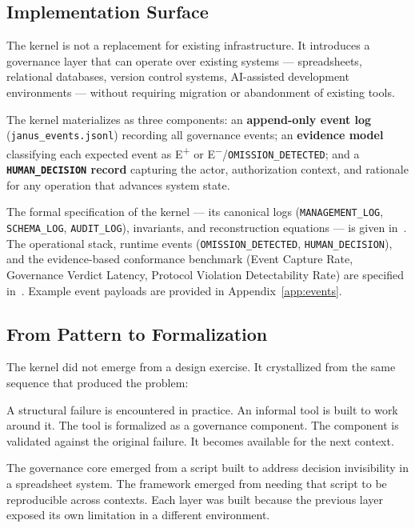 \documentclass[conference]{IEEEtran}
\begin{document}
\subsection{Implementation Surface}

The kernel is not a replacement for existing infrastructure. It introduces a governance layer that can operate over existing systems --- spreadsheets, relational databases, version control systems, AI-assisted development environments --- without requiring migration or abandonment of existing tools.

The kernel materializes as three components: an \textbf{append-only event log} (\texttt{janus\_events.jsonl}) recording all governance events; an \textbf{evidence model} classifying each expected event as E\textsuperscript{+} or E\textsuperscript{$-$}/\texttt{OMISSION\_DETECTED}; and a \textbf{\texttt{HUMAN\_DECISION} record} capturing the actor, authorization context, and rationale for any operation that advances system state.

The formal specification of the kernel --- its canonical logs (\texttt{MANAGEMENT\_LOG}, \texttt{SCHEMA\_LOG}, \texttt{AUDIT\_LOG}), invariants, and reconstruction equations --- is given in~\cite{sanchez_core}. The operational stack, runtime events (\texttt{OMISSION\_DETECTED}, \texttt{HUMAN\_DECISION}), and the evidence-based conformance benchmark (Event Capture Rate, Governance Verdict Latency, Protocol Violation Detectability Rate) are specified in~\cite{sanchez_framework}. Example event payloads are provided in Appendix~\ref{app:events}.

\subsection{From Pattern to Formalization}

The kernel did not emerge from a design exercise. It crystallized from the same sequence that produced the problem:

A structural failure is encountered in practice. An informal tool is built to work around it. The tool is formalized as a governance component. The component is validated against the original failure. It becomes available for the next context.

The governance core emerged from a script built to address decision invisibility in a spreadsheet system. The framework emerged from needing that script to be reproducible across contexts. Each layer was built because the previous layer exposed its own limitation in a different environment.
\end{document}
